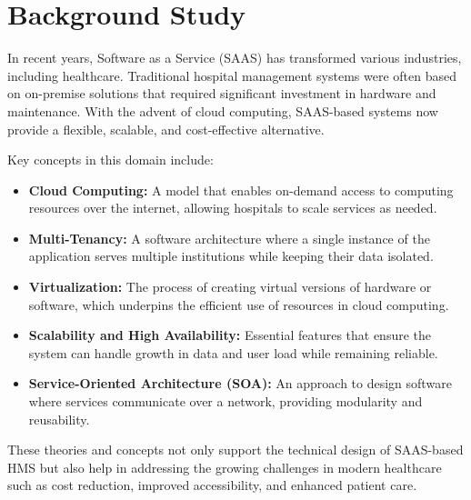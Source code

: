 \section{Background Study}
In recent years, Software as a Service (SAAS) has transformed various industries, including healthcare. Traditional hospital management systems were often based on on-premise solutions that required significant investment in hardware and maintenance. With the advent of cloud computing, SAAS-based systems now provide a flexible, scalable, and cost-effective alternative.

Key concepts in this domain include:
\begin{itemize}
  \item \textbf{Cloud Computing:} A model that enables on-demand access to computing resources over the internet, allowing hospitals to scale services as needed.
  \item \textbf{Multi-Tenancy:} A software architecture where a single instance of the application serves multiple institutions while keeping their data isolated.
  \item \textbf{Virtualization:} The process of creating virtual versions of hardware or software, which underpins the efficient use of resources in cloud computing.
  \item \textbf{Scalability and High Availability:} Essential features that ensure the system can handle growth in data and user load while remaining reliable.
  \item \textbf{Service-Oriented Architecture (SOA):} An approach to design software where services communicate over a network, providing modularity and reusability.
\end{itemize}

These theories and concepts not only support the technical design of SAAS-based HMS but also help in addressing the growing challenges in modern healthcare such as cost reduction, improved accessibility, and enhanced patient care.

